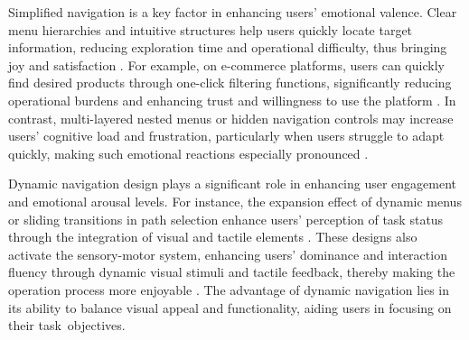 Simplified navigation is a key factor in enhancing users’ emotional valence. Clear menu hierarchies and intuitive structures help users quickly locate target information, reducing exploration time and operational difficulty, thus bringing joy and satisfaction \cite{wang2024enhancing}. For example, on e-commerce platforms, users can quickly find desired products through one-click filtering functions, significantly reducing operational burdens and enhancing trust and willingness to use the platform \cite{abdelaal2023accessibility}. In contrast, multi-layered nested menus or hidden navigation controls may increase users’ cognitive load and frustration, particularly when users struggle to adapt quickly, making such emotional reactions especially pronounced \cite{sheng2012effects}.

Dynamic navigation design plays a significant role in enhancing user engagement and emotional arousal levels. For instance, the expansion effect of dynamic menus or sliding transitions in path selection enhance users’ perception of task status through the integration of visual and tactile elements \cite{sundar2014user}. These designs also activate the sensory-motor system, enhancing users’ dominance and interaction fluency through dynamic visual stimuli and tactile feedback, thereby making the operation process more enjoyable \cite{lockyer2012affective}. The advantage of dynamic navigation lies in its ability to balance visual appeal and functionality, aiding users in focusing on their task~objectives.

